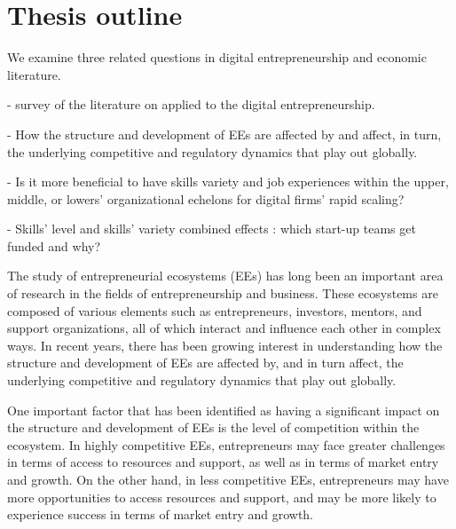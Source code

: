 \documentclass[12pt]{article}
\begin{document}

\section{Thesis outline}

We examine three related questions in digital entrepreneurship and economic literature.

- survey of the literature on applied to the digital entrepreneurship.

- How the structure and development of EEs are affected by and affect, in turn, the underlying competitive and regulatory dynamics that play out globally.

- Is it more beneficial to have skills variety and job experiences within the upper, middle, or lowers’ organizational echelons for digital firms’ rapid scaling?

- Skills’ level and skills’ variety combined effects : which start-up teams get funded and why?

The study of entrepreneurial ecosystems (EEs) has long been an important area of research in the fields of entrepreneurship and business. These ecosystems are composed of various elements such as entrepreneurs, investors, mentors, and support organizations, all of which interact and influence each other in complex ways. In recent years, there has been growing interest in understanding how the structure and development of EEs are affected by, and in turn affect, the underlying competitive and regulatory dynamics that play out globally.

One important factor that has been identified as having a significant impact on the structure and development of EEs is the level of competition within the ecosystem. In highly competitive EEs, entrepreneurs may face greater challenges in terms of access to resources and support, as well as in terms of market entry and growth. On the other hand, in less competitive EEs, entrepreneurs may have more opportunities to access resources and support, and may be more likely to experience success in terms of market entry and growth.
\end{document}
